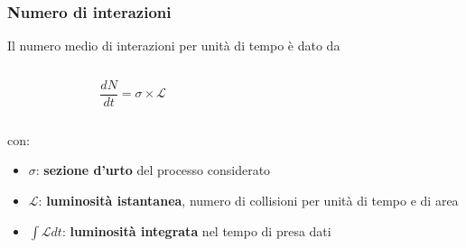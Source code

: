 \documentclass{beamer}
\begin{document}

\begin{frame}[t]
\frametitle{Numero di interazioni}


Il numero medio di interazioni per unit\`a di tempo \`e dato da\\
\medskip

\begin{columns}
\begin{column}{0.4\textwidth}
$$
\frac{dN}{dt} =\sigma \times \mathcal{L}
$$
\end{column}
\begin{column}{0.6\textwidth}
\end{column}
\end{columns}
\medskip
con:\\
\begin{itemize}
\item $\sigma$: \textbf{sezione d'urto} del processo considerato
\item $\mathcal{L}$: \textbf{luminosit\`a istantanea}, numero di collisioni 
per unit\`a di tempo e di area
\item $\int\mathcal{L}dt$: \textbf{luminosit\`a integrata} nel tempo di presa dati
\end{itemize}
\bigskip 

\end{frame}

\end{document}

